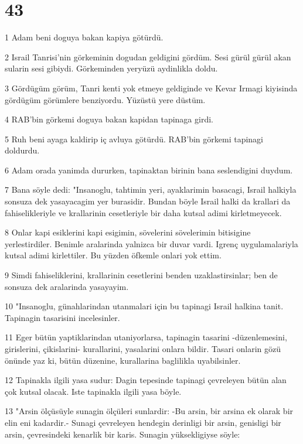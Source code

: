 \chapter{43}

\par 1 Adam beni doguya bakan kapiya götürdü.
\par 2 Israil Tanrisi'nin görkeminin dogudan geldigini gördüm. Sesi gürül gürül akan sularin sesi gibiydi. Görkeminden yeryüzü aydinlikla doldu.
\par 3 Gördügüm görüm, Tanri kenti yok etmeye geldiginde ve Kevar Irmagi kiyisinda gördügüm görümlere benziyordu. Yüzüstü yere düstüm.
\par 4 RAB'bin görkemi doguya bakan kapidan tapinaga girdi.
\par 5 Ruh beni ayaga kaldirip iç avluya götürdü. RAB'bin görkemi tapinagi doldurdu.
\par 6 Adam orada yanimda dururken, tapinaktan birinin bana seslendigini duydum.
\par 7 Bana söyle dedi: "Insanoglu, tahtimin yeri, ayaklarimin basacagi, Israil halkiyla sonsuza dek yasayacagim yer burasidir. Bundan böyle Israil halki da krallari da fahiselikleriyle ve krallarinin cesetleriyle bir daha kutsal adimi kirletmeyecek.
\par 8 Onlar kapi esiklerini kapi esigimin, sövelerini sövelerimin bitisigine yerlestirdiler. Benimle aralarinda yalnizca bir duvar vardi. Igrenç uygulamalariyla kutsal adimi kirlettiler. Bu yüzden öfkemle onlari yok ettim.
\par 9 Simdi fahiseliklerini, krallarinin cesetlerini benden uzaklastirsinlar; ben de sonsuza dek aralarinda yasayayim.
\par 10 "Insanoglu, günahlarindan utanmalari için bu tapinagi Israil halkina tanit. Tapinagin tasarisini incelesinler.
\par 11 Eger bütün yaptiklarindan utaniyorlarsa, tapinagin tasarini -düzenlemesini, girislerini, çikislarini- kurallarini, yasalarini onlara bildir. Tasari onlarin gözü önünde yaz ki, bütün düzenine, kurallarina baglilikla uyabilsinler.
\par 12 Tapinakla ilgili yasa sudur: Dagin tepesinde tapinagi çevreleyen bütün alan çok kutsal olacak. Iste tapinakla ilgili yasa böyle.
\par 13 "Arsin ölçüsüyle sunagin ölçüleri sunlardir: -Bu arsin, bir arsina ek olarak bir elin eni kadardir.- Sunagi çevreleyen hendegin derinligi bir arsin, genisligi bir arsin, çevresindeki kenarlik bir karis. Sunagin yüksekligiyse söyle:
